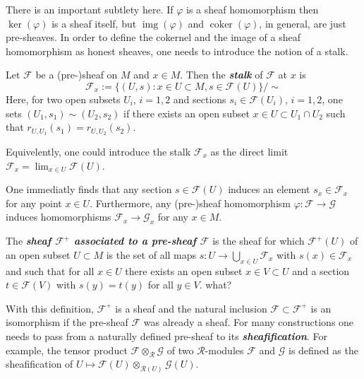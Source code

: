 \documentclass{article}
\newcommand{\Fc}{\mathcal{F}}
\newcommand{\Gc}{\mathcal{G}}
\newcommand{\Rc}{\mathcal{R}}
\DeclareMathOperator{\img}{img}
\DeclareMathOperator{\coker}{coker}
\begin{document}
There is an important subtlety here. If $\varphi$ is a sheaf homomorphism then $\ker(\varphi)$ is a sheaf itself, but $\img(\varphi)$ and $\coker(\varphi)$, in general, are just pre-sheaves. In order to define the cokernel and the image of a sheaf homomorphism as honest sheaves, one needs to introduce the notion of a stalk.
\begin{defn}
	Let $\Fc$ be a (pre-)sheaf on $M$ and $x\in M$. Then the \textbf{\textit{stalk}} of $\Fc$ at $x$ is
	\[\Fc_x:=\{(U,s):x\in U\subset M,s\in\Fc(U)\}/\sim\]
	Here, for two open subsets $U_i$, $i=1,2$ and sections $s_i\in\Fc(U_i)$, $i=1,2$, one sets $(U_1,s_1)\sim(U_2,s_2)$ if there exists an open subset $x\in U\subset U_1\cap U_2$ such that $r_{U,U_1}(s_1)=r_{U,U_2}(s_2)$.
	
	Equivelently, one could introduce the stalk $\Fc_x$ as the direct limit $\Fc_x=\lim_{x\in U}\Fc(U)$.
\end{defn}
\begin{remark}
	One immediatly finds that any section $s\in\Fc(U)$ induces an element $s_x\in\Fc_x$ for any point $x\in U$. Furthermore, any (pre-)sheaf homomorphism $\varphi:\Fc\to\Gc$ induces homomorphisms $\Fc_x\to\Gc_x$ for any $x\in M$.
\end{remark}
\begin{defn}
	The \textbf{\textit{sheaf $\Fc^+$ associated to a pre-sheaf $\Fc$}} is the sheaf for which $\Fc^+(U)$ of an open subset $U\subset M$ is the set of all maps $s:U\to\bigcup_{x\in U}\Fc_x$ with $s(x)\in\Fc_x$ and such that for all $x\in U$ there exists an open subset $x\in V\subset U$ and a section $t\in\Fc(V)$ with $s(y)=t(y)$ for all $y\in V$. {\color{magenta}what?}
\end{defn}
\begin{remark}
	With this definition, $\Fc^+$ is a sheaf and the natural inclusion $\Fc\subset\Fc^+$ is an isomorphism if the pre-sheaf $\Fc$ was already a sheaf. For many constructions one needs to pass from a naturally defined pre-sheaf to its \textbf{\textit{sheafification}}. For example, the tensor product $\Fc\otimes_{\Rc}\Gc$ of two $\Rc$-modules $\Fc$ and $\Gc$ is defined as the sheafification of $U\mapsto\Fc(U)\otimes_{\Rc(U)}\Gc(U)$.
\end{remark}
\end{document}
